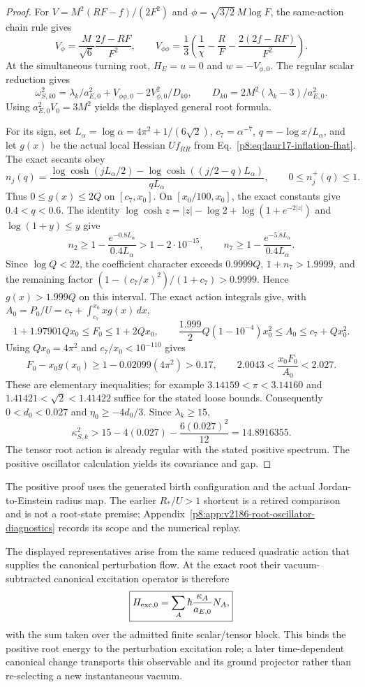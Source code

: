 \documentclass[12pt,a4paper]{article}
\begin{document}
\begin{proof}
For $V=M^2(RF-f)/(2F^2)$ and
$\phi=\sqrt{3/2}\,M\log F$, the same-action chain rule gives
\[
 V_\phi=\frac M{\sqrt6}\frac{2f-RF}{F^2},\qquad
 V_{\phi\phi}=\frac13\left(\frac1\chi-\frac RF
 -\frac{2(2f-RF)}{F^2}\right).
\]
At the simultaneous turning root, $H_E=u=0$ and $w=-V_{\phi,0}$.
The regular scalar reduction gives
\[
 \omega_{S,k0}^2=\lambda_k/a_{E,0}^2+V_{\phi\phi,0}
 -2V_{\phi,0}^2/D_{k0},\qquad
 D_{k0}=2M^2(\lambda_k-3)/a_{E,0}^2.
\]
Using $a_{E,0}^2V_0=3M^2$ yields the displayed general root formula.

For its sign, set $L_\alpha=\log\alpha=4\pi^2+1/(6\sqrt2)$,
$c_7=\alpha^{-7}$, $q=-\log x/L_\alpha$, and let $g(x)$ be the actual
local Hessian $Uf_{RR}$ from
Eq.~\eqref{p8:eq:laur17-inflation-fhat}. The exact secants obey
\[
 n_j(q)=\frac{\log\cosh(jL_\alpha/2)
 -\log\cosh((j/2-q)L_\alpha)}{qL_\alpha},\qquad
 0\le n_j^+(q)\le1.
\]
Thus $0\le g(x)\le2Q$ on $[c_7,x_0]$. On
$[x_0/100,x_0]$, the exact constants give $0.4<q<0.6$.
The identity
$\log\cosh z=|z|-\log2+\log(1+e^{-2|z|})$
and $\log(1+y)\le y$ give
\[
 n_2\ge1-\frac{e^{-0.8L_\alpha}}{0.4L_\alpha}
 >1-2\cdot10^{-15},\qquad
 n_7\ge1-\frac{e^{-5.8L_\alpha}}{0.4L_\alpha}.
\]
Since $\log Q<22$, the coefficient character exceeds $0.9999Q$,
$1+n_7>1.9999$, and the remaining factor
$(1-(c_7/x)^2)/(1+c_7)>0.9999$. Hence $g(x)>1.999Q$
on this interval. The exact action integrals give, with
$A_0=P_0/U=c_7+\int_{c_7}^{x_0}xg(x)\,dx$,
\[
 1+1.97901Qx_0\le F_0\le1+2Qx_0,\qquad
 \frac{1.999}{2}Q(1-10^{-4})x_0^2\le A_0\le c_7+Qx_0^2.
\]
Using $Qx_0=4\pi^2$ and $c_7/x_0<10^{-110}$ gives
\[
 F_0-x_0g(x_0)\ge1-0.02099(4\pi^2)>0.17,
 \qquad 2.0043<\frac{x_0F_0}{A_0}<2.027.
\]
These are elementary inequalities; for example
$3.14159<\pi<3.14160$ and $1.41421<\sqrt2<1.41422$ suffice for the
stated loose bounds. Consequently $0<d_0<0.027$ and
$\eta_0\ge-4d_0/3$. Since $\lambda_k\ge15$,
\[
 \kappa_{S,k}^2>
 15-4(0.027)-\frac{6(0.027)^2}{12}=14.8916355.
\]
The tensor root action is already regular with the stated positive spectrum.
The positive oscillator calculation yields its covariance and gap.
\end{proof}
The positive proof uses the generated birth configuration and the actual
Jordan-to-Einstein radius map. The earlier $R_*/U>1$ shortcut is a retired
comparison and is not a root-state premise; Appendix~\ref{p8:app:v2186-root-oscillator-diagnostics}
records its scope and the numerical replay.

The displayed representatives arise from the same reduced quadratic action
that supplies the canonical perturbation flow.  At the exact root their
vacuum-subtracted canonical excitation operator is therefore
\[
 \boxed{H_{{\rm exc},0}
 =\sum_A\hbar\frac{\kappa_A}{a_{E,0}}N_A,}
\]
with the sum taken over the admitted finite scalar/tensor block.  This binds
the positive root energy to the perturbation excitation role; a later
time-dependent canonical change transports this observable and its ground
projector rather than re-selecting a new instantaneous vacuum.
\end{document}
